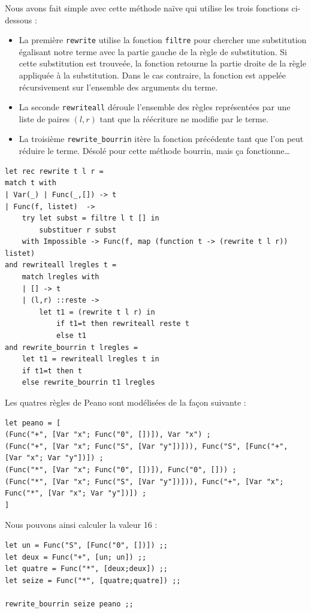 \documentclass[11pt]{book}
\begin{document}
Nous avons fait simple avec cette méthode naïve qui utilise les trois fonctions ci-dessous :
\begin{itemize}
	\item La première \verb+rewrite+ utilise la fonction \verb+filtre+ pour chercher une substitution
	égalisant notre terme avec la partie gauche de la règle de substitution. Si cette substitution est trouveée, la 
	fonction retourne la partie droite de la règle appliquée à la substitution. Dans le cas contraire, la fonction
	est appelée récursivement sur l'ensemble des arguments du terme.
	\item  La seconde \verb+rewriteall+ déroule l'ensemble des règles représentées par une liste de paires $(l,r)$ tant
	que la réécriture ne modifie par le terme.
	\item La troisième \verb+rewrite_bourrin+ itère la fonction précédente tant que l'on peut réduire le terme.
	Désolé pour cette méthode bourrin, mais ça fonctionne\dots
\end{itemize}

\begin{Verbatim}
let rec rewrite t l r =
match t with
| Var(_) | Func(_,[]) -> t
| Func(f, listet)  -> 
	try let subst = filtre l t [] in
		substituer r subst 
	with Impossible -> Func(f, map (function t -> (rewrite t l r)) listet)
and rewriteall lregles t =
	match lregles with
	| [] -> t
	| (l,r) ::reste -> 
		let t1 = (rewrite t l r) in
			if t1=t then rewriteall reste t 
			else t1
and rewrite_bourrin t lregles =
	let t1 = rewriteall lregles t in
	if t1=t then t
	else rewrite_bourrin t1 lregles
\end{Verbatim}

Les quatres règles de Peano sont modélisées de la façon suivante :
\begin{Verbatim}
let peano = [
(Func("+", [Var "x"; Func("0", [])]), Var "x") ;
(Func("+", [Var "x"; Func("S", [Var "y"])])), Func("S", [Func("+", [Var "x"; Var "y"])]) ;
(Func("*", [Var "x"; Func("0", [])]), Func("0", [])) ;
(Func("*", [Var "x"; Func("S", [Var "y"])])), Func("+", [Var "x"; Func("*", [Var "x"; Var "y"])]) ;
] 
\end{Verbatim}

Nous pouvons ainsi calculer la valeur 16 :
\begin{Verbatim}
let un = Func("S", [Func("0", [])]) ;;
let deux = Func("+", [un; un]) ;;
let quatre = Func("*", [deux;deux]) ;;
let seize = Func("*", [quatre;quatre]) ;;

rewrite_bourrin seize peano ;;    
	
\end{Verbatim}
\end{document}
